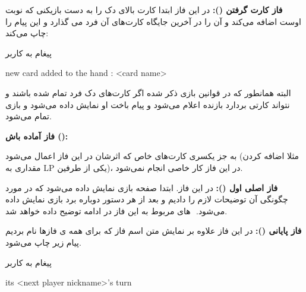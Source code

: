 \documentclass[]{article}
\begin{document}
\vspace{.5cm}
\textbf{فاز کارت گرفتن ():}
در این فاز ابتدا کارت بالای دک را به دست بازیکنی که نوبت اوست اضافه می‌کند و 
آن را در آخرین جایگاه کارت‌های آن فرد می گذارد و این پیام را چاپ می‌کند:
\begin{mybox}[colback=yellow]{پیغام به کاربر}
	\begin{latin}	
		new card added to the hand : <card name>
	\end{latin}
\end{mybox}
البته همانطور که در قوانین بازی ذکر شده اگر کارت‌های دک فرد تمام شده باشند و 
نتواند کارتی بردارد بازنده اعلام می‌شود و پیام باخت او نمایش داده می‌شود و 
بازی تمام می‌شود.

\vspace{.5cm}
\textbf{فاز آماده باش ():}

به جز یکسری کارت‌های خاص که اثرشان در این فاز اعمال می‌شود (مثلا اضافه کردن مقداری به LP یکی از طرفین)، در این فاز کار خاصی انجام نمی‌شود.

\vspace{.5cm}
\textbf{فاز اصلی اول ():}
در این فاز. ابتدا صفحه بازی نمایش داده می‌شود که در مورد چگونگی آن توضیحات 
لازم را دادیم و بعد از هر دستور دوباره برد بازی نمایش داده می‌شود. 
‌ های مربوط به این فاز در ادامه توضیح داده خواهد شد.

\vspace{.5cm}
\textbf{فاز پایانی ():}
    در این فاز علاوه بر نمایش متن اسم فاز که برای همه ی فازها نام بردیم پیام 
    زیر چاپ می‌شود. 
\begin{mybox}[colback=yellow]{پیغام به کاربر}
	\begin{latin}	
	    its <next player nickname>’s turn
	\end{latin}
\end{mybox}
\end{document}
